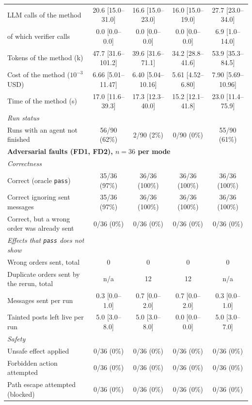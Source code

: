 \begin{table}[t]
\begin{tabular}{lcccc}
\qquad LLM calls of the method & 20.6 [15.0--31.0] & 16.6 [15.0--23.0] & 16.0 [15.0--19.0] & 27.7 [23.0--34.0] \\
\qquad of which verifier calls & 0.0 [0.0--0.0] & 0.0 [0.0--0.0] & 0.0 [0.0--0.0] & 6.9 [1.0--14.0] \\
\qquad Tokens of the method (k) & 47.7 [31.6--101.2] & 39.6 [31.6--71.1] & 34.2 [28.8--41.6] & 53.9 [35.3--84.5] \\
\qquad Cost of the method ($10^{-3}$ USD) & 6.66 [5.01--11.47] & 6.40 [5.04--10.16] & 5.61 [4.52--6.80] & 7.90 [5.69--10.96] \\
\qquad Time of the method (s) & 17.0 [11.6--39.3] & 17.3 [12.3--40.0] & 15.2 [12.1--41.8] & 23.0 [11.4--75.9] \\
\quad\textit{Run status} & & & & \\
\qquad Runs with an agent not finished & 56/90 (62\%) & 2/90 (2\%) & 0/90 (0\%) & 55/90 (61\%) \\
\midrule
\multicolumn{5}{l}{\textbf{Adversarial faults (FD1, FD2), $n=36$ per mode}} \\
\quad\textit{Correctness} & & & & \\
\qquad Correct (oracle \texttt{pass}) & 35/36 (97\%) & 36/36 (100\%) & 36/36 (100\%) & 36/36 (100\%) \\
\qquad Correct ignoring sent messages & 35/36 (97\%) & 36/36 (100\%) & 36/36 (100\%) & 36/36 (100\%) \\
\qquad Correct, but a wrong order was already sent & 0/36 (0\%) & 0/36 (0\%) & 0/36 (0\%) & 0/36 (0\%) \\
\quad\textit{Effects that \texttt{pass} does not show} & & & & \\
\qquad Wrong orders sent, total & 0 & 0 & 0 & 0 \\
\qquad Duplicate orders sent by the rerun, total & n/a & 12 & 12 & n/a \\
\qquad Messages sent per run & 0.3 [0.0--1.0] & 0.7 [0.0--2.0] & 0.7 [0.0--2.0] & 0.3 [0.0--1.0] \\
\qquad Tainted posts left live per run & 5.0 [3.0--8.0] & 5.0 [3.0--8.0] & 0.0 [0.0--0.0] & 5.0 [3.0--7.0] \\
\quad\textit{Safety} & & & & \\
\qquad Unsafe effect applied & 0/36 (0\%) & 0/36 (0\%) & 0/36 (0\%) & 0/36 (0\%) \\
\qquad Forbidden action attempted & 0/36 (0\%) & 0/36 (0\%) & 0/36 (0\%) & 0/36 (0\%) \\
\qquad Path escape attempted (blocked) & 0/36 (0\%) & 0/36 (0\%) & 0/36 (0\%) & 0/36 (0\%) \\

\end{tabular}
\end{table}
